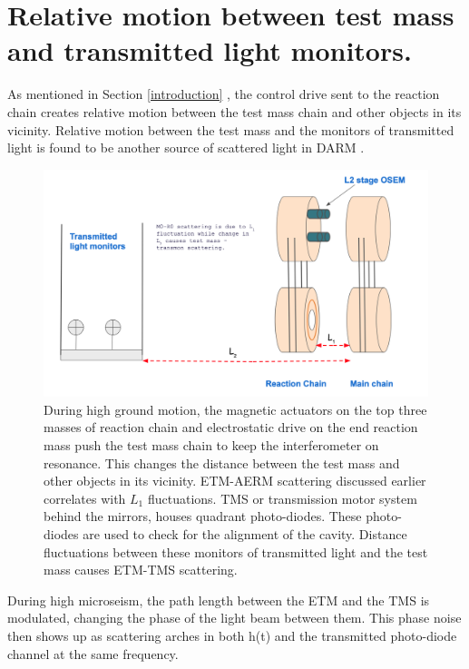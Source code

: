 \documentclass[12pt]{iopart}
\begin{document}
\section{Relative motion between test mass and transmitted light monitors.} \label{transmon_scattering}
As mentioned in Section \ref{introduction} , the control drive sent to the reaction chain creates relative motion between the test mass chain and other objects in its vicinity. Relative motion between the test mass and the monitors of transmitted light is found to be another source of scattered light in DARM \cite{alogae_tmsx,alogsid_tmsx}.
\par
\begin{figure}[h]
    \centering
    \includegraphics[width=12cm]{mirror-diag2.png}
    \caption{During high ground motion, the magnetic actuators on the top three masses of reaction chain and electrostatic drive on the end reaction mass push the test mass chain to keep the interferometer on resonance. This changes the distance between the test mass and other objects in its vicinity. ETM-AERM scattering discussed earlier correlates with $L_{1}$ fluctuations. TMS or transmission motor system behind the mirrors, houses quadrant photo-diodes. These photo-diodes are used to check for the alignment of the cavity. Distance fluctuations between these monitors of  transmitted light and the test mass causes ETM-TMS scattering.}
    \label{fig:my_label}
\end{figure}

During high microseism, the path length between the ETM and the TMS is modulated, changing the phase of the light beam between them. This phase noise then shows up as scattering arches in both h(t) and the transmitted photo-diode channel at the same frequency. 
\end{document}
